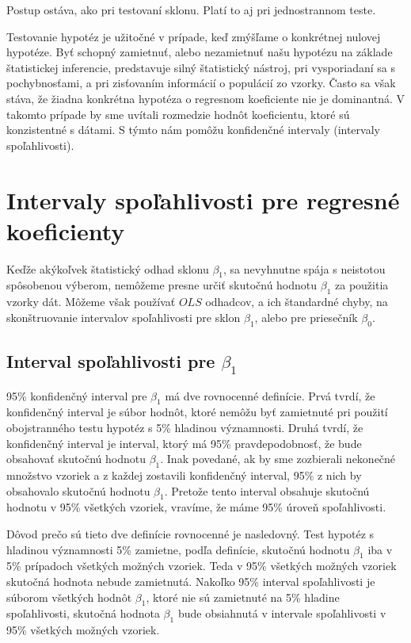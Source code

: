 \documentclass[]{tukediphc}
\begin{document}
Postup ostáva, ako pri testovaní sklonu. Platí to aj pri jednostrannom teste.

Testovanie hypotéz je užitočné v prípade, keď zmýšľame o konkrétnej nulovej hypotéze. Byť schopný zamietnuť, alebo nezamietnuť našu hypotézu na základe štatistickej inferencie, predstavuje silný štatistický nástroj, pri vysporiadaní sa s pochybnosťami, a pri zisťovaním informácií o populácií zo vzorky. Často sa však stáva, že žiadna konkrétna hypotéza o regresnom koeficiente nie je dominantná. V takomto prípade by sme uvítali rozmedzie hodnôt koeficientu, ktoré sú konzistentné s dátami. S týmto nám pomôžu konfidenčné intervaly (intervaly spoľahlivosti). 

\newpage
\section{Intervaly spoľahlivosti pre regresné koeficienty}

Keďže akýkoľvek štatistický odhad sklonu $\beta_{1}$, sa nevyhnutne spája s neistotou spôsobenou výberom, nemôžeme presne určiť skutočnú hodnotu $\beta_{1}$ za použitia vzorky dát. Môžeme však používať $OLS$ odhadcov, a ich štandardné chyby, na skonštruovanie intervalov spoľahlivosti pre sklon $\beta_{1}$, alebo pre priesečník $\beta_{0}$. 

\subsection{Interval spoľahlivosti pre $\beta_{1}$}

95\% konfidenčný interval pre $\beta_{1}$ má dve rovnocenné definície. Prvá tvrdí, že konfidenčný interval je súbor hodnôt, ktoré nemôžu byť zamietnuté pri použití obojstranného testu hypotéz s 5\% hladinou významnosti. Druhá tvrdí, že konfidenčný interval je interval, ktorý má 95\% pravdepodobnosť, že bude obsahovať skutočnú hodnotu $\beta_{1}$. Inak povedané, ak by sme zozbierali nekonečné množstvo vzoriek a z každej zostavili konfidenčný interval, 95\% z nich by obsahovalo skutočnú hodnotu $\beta_{1}$. Pretože tento interval obsahuje skutočnú hodnotu v 95\% všetkých vzoriek, vravíme, že máme 95\% úroveň spoľahlivosti.

Dôvod prečo sú tieto dve definície rovnocenné je nasledovný. Test hypotéz s hladinou významnosti 5\% zamietne, podľa definície, skutočnú hodnotu $\beta_{1}$ iba v 5\% prípadoch všetkých možných vzoriek. Teda v 95\% všetkých možných vzoriek skutočná hodnota nebude zamietnutá. Nakoľko 95\% interval spoľahlivosti je súborom všetkých hodnôt $\beta_{1}$, ktoré nie sú zamietnuté na 5\% hladine spoľahlivosti, skutočná hodnota $\beta_{1}$ bude obsiahnutá v intervale spoľahlivosti v 95\% všetkých možných vzoriek.
\end{document}
